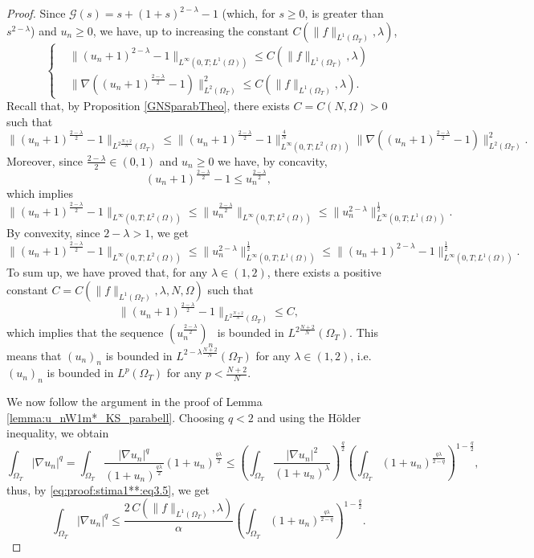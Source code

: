 \documentclass{amsart}
\numberwithin{equation}{section}
\def\elle#1{L^{#1}}
\def\elleom#1{L^{#1}(\Omega)}
\def\elleomT#1{L^{#1}(\Omega_T)}
\def\ioT{\int_{\Omega_T}}
\def\norma#1#2{ \|#1 \|_{#2}}
\newcommand{\abs}[1]{\left|#1\right|}
\begin{document}
\begin{proof}
    Since $\mathcal{G}(s)=s+(1+s)^{2-\lambda}-1$ (which, for $s\geq0$, is greater than $s^{2-\lambda}$) and $u_n\geq0$, we have, up to increasing the constant $C\left(\|f\|_{L^1(\Omega_T)},\lambda\right)$,
    \begin{equation}\label{DoppiaStima-Lemma-StimaconfL1}
        \left\{\begin{aligned}
        & \norma{(u_n+1)^{2-\lambda}-1}{\elle\infty(0,T;\elleom1)}\leq C\left(\|f\|_{L^1(\Omega_T)}, \lambda\right)\\
        & \norma{\nabla \left((u_n+1)^\frac{2-\lambda}{2}-1\right)}{\elleomT2}^2\leq C\left(\|f\|_{L^1(\Omega_T)}, \lambda\right).
        \end{aligned}\right.
    \end{equation}
    Recall that, by Proposition \eqref{GNSparabTheo}, there exists $C=C(N,\Omega)>0$ such that
    $$\norma{(u_n+1)^\frac{2-\lambda}{2}-1}{\elleomT{2\frac{N+2}{N}}}
    \leq\norma{(u_n+1)^\frac{2-\lambda}{2}-1}{\elle\infty(0,T;\elleom2)}^\frac{4}{N}
    \norma{\nabla \left((u_n+1)^\frac{2-\lambda}{2}-1\right)}{\elleomT2}^2.
    $$
    Moreover, since $\frac{2-\lambda}{2}\in (0,1)$ and $u_n\geq0$ we have, by concavity,
    $$(u_n+1)^\frac{2-\lambda}{2}-1\leq u_n^\frac{2-\lambda}{2},$$
    which implies
    $$
    \norma{(u_n+1)^\frac{2-\lambda}{2}-1}{\elle\infty(0,T;\elleom2)}
    \leq 
    \norma{u_n^\frac{2-\lambda}{2}}{\elle\infty(0,T;\elleom2)}
    \leq
    \norma{u_n^{2-\lambda}}{\elle\infty(0,T;\elleom1)}^\frac{1}{2}.$$
    By convexity, since $2-\lambda>1$, we get
    $$\norma{(u_n+1)^\frac{2-\lambda}{2}-1}{\elle\infty(0,T;\elleom2)}
    \leq 
    \norma{u_n^{2-\lambda}}{\elle\infty(0,T;\elleom1)}^\frac{1}{2}
    \leq
    \norma{(u_n+1)^{2-\lambda}-1}{\elle\infty(0,T;\elleom1)}^\frac{1}{2}.$$
    To sum up, we have proved that, for any $\lambda\in(1,2)$, there exists a positive constant $C=C\left(\norma{f}{\elleomT1},\lambda,N,\Omega\right)$ such that
    \begin{equation}\label{eq:proof:stima1**:eq4}
        \norma{(u_n+1)^\frac{2-\lambda}{2}-1}{\elleomT{2\frac{N+2}{N}}}
    \leq C,
    \end{equation}
    which implies that the sequence $(u_n^\frac{2-\lambda}{2})_n$ is bounded in $\elleomT{2\frac{N+2}{N}}$. This means that $(u_n)_n$ is bounded in $\elleomT{{2-\lambda}\frac{N+2}{N}}$ for any $\lambda\in(1,2)$, i.e. $(u_n)_n$ is bounded in $\elleomT p$ for any $p<\frac{N+2}{N}$.

    We now follow the argument in the proof of Lemma \ref{lemma:u_nW1m*_KS_parabell}. Choosing $q<2$ and using the H\"older inequality, we obtain 
    $$\ioT \abs{\nabla u_n}^q =
    \ioT \frac{\abs{\nabla u_n}^q}{(1+u_n)^{\frac{q\lambda}{2}}}(1+u_n)^{\frac{q\lambda}{2}} 
    \leq
    \left(\ioT \frac{\abs{\nabla u_n}^2}{(1+u_n)^{\lambda}}\right)^\frac{q}{2}
    \left(\ioT (1+u_n)^{\frac{q\lambda}{2-q}}\right)^{1-\frac{q}{2}},$$
    thus, by \eqref{eq:proof:stima1**:eq3.5}, we get
    $$\ioT \abs{\nabla u_n}^q\leq 
     \frac{2\,C\left(\norma{f}{\elleomT1}, \lambda\right)}{\alpha}
    \left(\ioT (1+u_n)^{\frac{q\lambda}{2-q}}\right)^{1-\frac{q}{2}}.$$


\end{proof}
\end{document}
